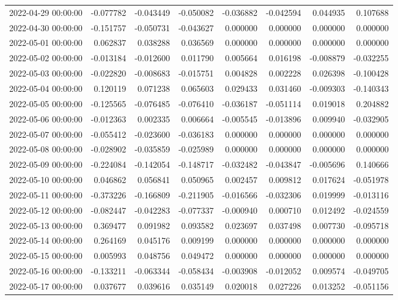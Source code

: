 \begin{tabular}{lrrrrrrr}
2022-04-29 00:00:00 & -0.077782 & -0.043449 & -0.050082 & -0.036882 & -0.042594 & 0.044935 & 0.107688 \\
2022-04-30 00:00:00 & -0.151757 & -0.050731 & -0.043627 & 0.000000 & 0.000000 & 0.000000 & 0.000000 \\
2022-05-01 00:00:00 & 0.062837 & 0.038288 & 0.036569 & 0.000000 & 0.000000 & 0.000000 & 0.000000 \\
2022-05-02 00:00:00 & -0.013184 & -0.012600 & 0.011790 & 0.005664 & 0.016198 & -0.008879 & -0.032255 \\
2022-05-03 00:00:00 & -0.022820 & -0.008683 & -0.015751 & 0.004828 & 0.002228 & 0.026398 & -0.100428 \\
2022-05-04 00:00:00 & 0.120119 & 0.071238 & 0.065603 & 0.029433 & 0.031460 & -0.009303 & -0.140343 \\
2022-05-05 00:00:00 & -0.125565 & -0.076485 & -0.076410 & -0.036187 & -0.051114 & 0.019018 & 0.204882 \\
2022-05-06 00:00:00 & -0.012363 & 0.002335 & 0.006664 & -0.005545 & -0.013896 & 0.009940 & -0.032905 \\
2022-05-07 00:00:00 & -0.055412 & -0.023600 & -0.036183 & 0.000000 & 0.000000 & 0.000000 & 0.000000 \\
2022-05-08 00:00:00 & -0.028902 & -0.035859 & -0.025989 & 0.000000 & 0.000000 & 0.000000 & 0.000000 \\
2022-05-09 00:00:00 & -0.224084 & -0.142054 & -0.148717 & -0.032482 & -0.043847 & -0.005696 & 0.140666 \\
2022-05-10 00:00:00 & 0.046862 & 0.056841 & 0.050965 & 0.002457 & 0.009812 & 0.017624 & -0.051978 \\
2022-05-11 00:00:00 & -0.373226 & -0.166809 & -0.211905 & -0.016566 & -0.032306 & 0.019999 & -0.013116 \\
2022-05-12 00:00:00 & -0.082447 & -0.042283 & -0.077337 & -0.000940 & 0.000710 & 0.012492 & -0.024559 \\
2022-05-13 00:00:00 & 0.369477 & 0.091982 & 0.093582 & 0.023697 & 0.037498 & 0.007730 & -0.095718 \\
2022-05-14 00:00:00 & 0.264169 & 0.045176 & 0.009199 & 0.000000 & 0.000000 & 0.000000 & 0.000000 \\
2022-05-15 00:00:00 & 0.005993 & 0.048756 & 0.049472 & 0.000000 & 0.000000 & 0.000000 & 0.000000 \\
2022-05-16 00:00:00 & -0.133211 & -0.063344 & -0.058434 & -0.003908 & -0.012052 & 0.009574 & -0.049705 \\
2022-05-17 00:00:00 & 0.037677 & 0.039616 & 0.035149 & 0.020018 & 0.027226 & 0.013252 & -0.051156 \\

\end{tabular}
